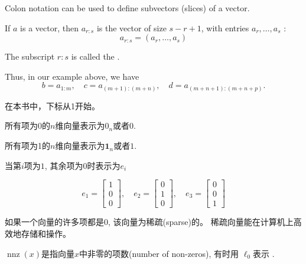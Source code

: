 \begin{definition}[Subvectors]
    Colon notation can be used to define subvectors (slices) of a vector.

    If $ a $ is a vector, then $ a_{r: s} $ is the vector of size $ s-r+1 $, with entries $ a_{r}, \ldots, a_{s} $ :
    $$
    a_{r: s}=\left(a_{r}, \ldots, a_{s}\right)
    $$

    The subscript $ r:s $ is called the . 
\end{definition}

Thus, in our example above, we have
    $$
    b=a_{1: m}, \quad c=a_{(m+1):(m+n)}, \quad d=a_{(m+n+1):(m+n+p)} .
    $$

\begin{remark}
    在本书中，下标从1开始。
\end{remark}

\begin{definition}[零向量]
    所有项为$0$的$n$维向量表示为$0_n$或者$0$.
\end{definition}

\begin{definition}[全一向量]
      所有项为1的$n$维向量表示为$\boldsymbol{1}_n$或者$1$.
\end{definition}

\begin{definition}[单位向量]
    当第$i$项为$1$, 其余项为$0$时表示为$e_i$
\end{definition}

\begin{example}
    $$ {e}_{1}=\left[\begin{array}{l}1 \\ 0 \\ 0\end{array}\right], \quad e_{2}=\left[\begin{array}{l}0 \\ 1 \\ 0\end{array}\right], \quad e_{3}=\left[\begin{array}{l}0 \\ 0 \\ 1\end{array}\right] $$
\end{example}

\begin{definition}[稀疏向量]
    如果一个向量的许多项都是0, 该向量为稀疏(sparse)的。 稀疏向量能在计算机上高效地存储和操作。 

$\operatorname{nnz}(x)$是指向量$x$中非零的项数(number of non-zeros), 有时用 $\ell_0$表示 . 

\end{definition}

